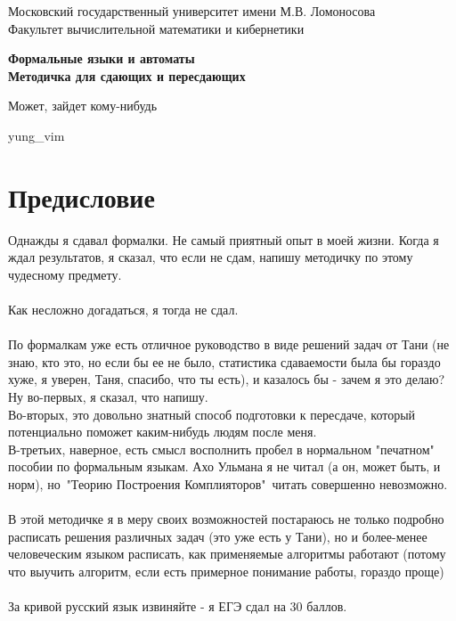 \documentclass[14pt]{extreport}
\begin{document}
	\begin{titlepage}
		\begin{center}  
			\large{Московский государственный университет имени М.В. Ломоносова\\
			Факультет вычислительной математики и кибернетики}\\
		\end{center}
		\begin{center}
			\vspace{160pt}
			\LARGE{\textbf{Формальные языки и автоматы\\}}
			\LARGE{\textbf{Методичка для сдающих и пересдающих}}
			\vspace{320pt}
		\end{center}
		\begin{center}
			\large{Может, зайдет кому-нибудь}
		\end{center}
		\begin{center}
			yung\_vim
		\end{center}
	\end{titlepage}
	\newpage
	\tableofcontents
	\newpage
	\chapter*{Предисловие}
		Однажды я сдавал формалки. Не самый приятный опыт в моей жизни. Когда я ждал результатов,
		я сказал, что если не сдам, напишу методичку по этому чудесному предмету.\\
		\\
		Как несложно догадаться, я тогда не сдал.
		\\\\
		По формалкам уже есть отличное руководство в виде решений задач от Тани (не знаю, кто это,
		но если бы ее не было, статистика сдаваемости была бы гораздо хуже, я уверен, Таня,
		спасибо, что ты есть), и казалось
		бы - зачем я это делаю?\\
		Ну во-первых, я сказал, что напишу.\\
		Во-вторых, это довольно знатный способ подготовки к пересдаче, который потенциально
		поможет каким-нибудь людям после меня.\\
		В-третьих, наверное, есть смысл восполнить пробел в нормальном "печатном" пособии по
		формальным языкам. Ахо Ульмана я не читал (а он, может быть, и норм), но\ "Теорию
		Построения Комплияторов"\ читать совершенно невозможно.
		\\\\
		В этой методичке я в меру своих возможностей постараюсь не только подробно
		расписать решения различных задач (это уже есть у Тани), но и более-менее человеческим
		языком расписать, как применяемые алгоритмы работают (потому что выучить алгоритм, если
		есть примерное понимание работы, гораздо проще)
		\\\\
		За кривой русский язык извиняйте - я ЕГЭ сдал на 30 баллов.
	\newpage
	
\end{document}
